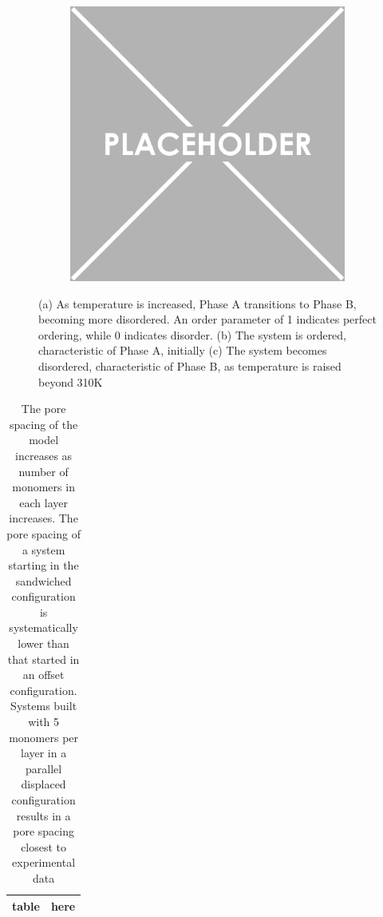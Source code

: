 \documentclass{article}
\begin{document}
\begin{figure}
\begin{subfigure}
		\caption{}\label{fig:order}
	\end{subfigure}
	\begin{subfigure}
		\centering
		\includegraphics[width=\linewidth]{placeholder.png}
		\caption{}\label{fig:disorder}
	\end{subfigure}
	\caption{(a) As temperature is increased, Phase A transitions to Phase B, becoming more disordered. An order parameter of 1 indicates perfect ordering, while 0 indicates disorder. (b) The system is ordered, characteristic of Phase A, initially (c) The system becomes disordered, characteristic of Phase B, as temperature is raised beyond 310K}\label{fig:transition}
	\end{figure}	

	\begin{table}
	\centering
	\begin{tabular}{|c|c|}
	\hline
	table & here \\
	\hline
	\end{tabular}
	\caption{The pore spacing of the model increases as number of monomers in each layer increases. The pore spacing of a system starting in the sandwiched configuration is systematically lower than that started in an offset configuration. Systems built with 5 monomers per layer in a parallel displaced configuration results in a pore spacing closest to experimental data}\label{table:p2p} 
	\end{table}
	
\end{document}
